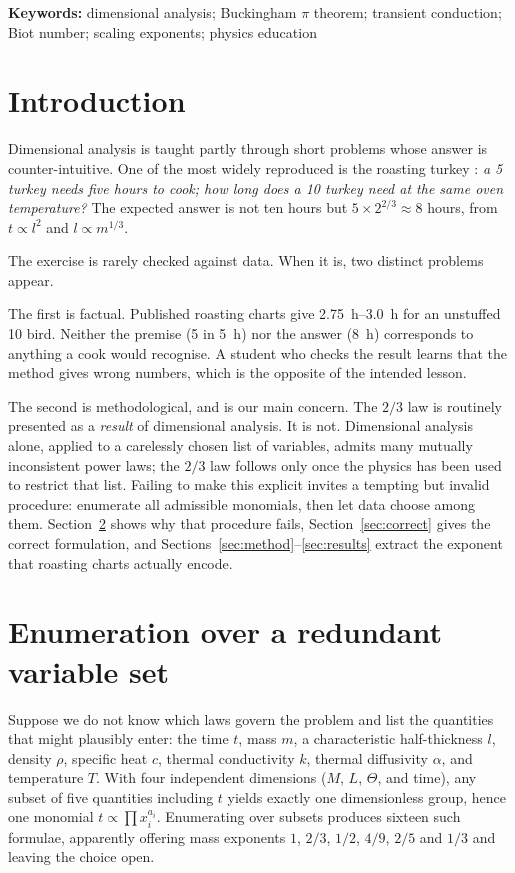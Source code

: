 \noindent\textbf{Keywords:} dimensional analysis; Buckingham $\pi$ theorem;
transient conduction; Biot number; scaling exponents; physics education

\section{Introduction}

Dimensional analysis \cite{buckingham1914,barenblatt1996} is taught partly
through short problems whose answer is counter-intuitive. One of the most
widely reproduced is the roasting turkey
\cite{rossi2001,buffalo}: \emph{a \SI{5}{\pound} turkey needs five hours
to cook; how long does a \SI{10}{\pound} turkey need at the same oven
temperature?} The expected answer is not ten hours but
$5 \times 2^{2/3} \approx 8$ hours, from $t \propto l^{2}$ and
$l \propto m^{1/3}$.

The exercise is rarely checked against data. When it is, two distinct
problems appear.

The first is factual. Published roasting charts \cite{usda,chart} give
\SIrange{2.75}{3.0}{\hour} for an unstuffed \SI{10}{\pound} bird. Neither the
premise (\SI{5}{\pound} in \SI{5}{\hour}) nor the answer (\SI{8}{\hour})
corresponds to anything a cook would recognise. A student who checks the
result learns that the method gives wrong numbers, which is the opposite
of the intended lesson.

The second is methodological, and is our main concern. The $2/3$ law is
routinely presented as a \emph{result} of dimensional analysis. It is not.
Dimensional analysis alone, applied to a carelessly chosen list of
variables, admits many mutually inconsistent power laws; the $2/3$ law
follows only once the physics has been used to restrict that list. Failing
to make this explicit invites a tempting but invalid procedure: enumerate
all admissible monomials, then let data choose among them. Section~\ref{sec:enum}
shows why that procedure fails, Section~\ref{sec:correct} gives the correct
formulation, and Sections~\ref{sec:method}--\ref{sec:results} extract the
exponent that roasting charts actually encode.

\section{Enumeration over a redundant variable set}
\label{sec:enum}

Suppose we do not know which laws govern the problem and list the
quantities that might plausibly enter: the time $t$, mass $m$, a
characteristic half-thickness $l$, density $\rho$, specific heat $c$,
thermal conductivity $k$, thermal diffusivity $\alpha$, and temperature
$T$. With four independent dimensions ($M$, $L$, $\Theta$, and time), any
subset of five quantities including $t$ yields exactly one dimensionless
group, hence one monomial $t \propto \prod x_i^{a_i}$. Enumerating over
subsets produces sixteen such formulae, apparently offering mass exponents
$1$, $2/3$, $1/2$, $4/9$, $2/5$ and $1/3$ and leaving the choice open.

